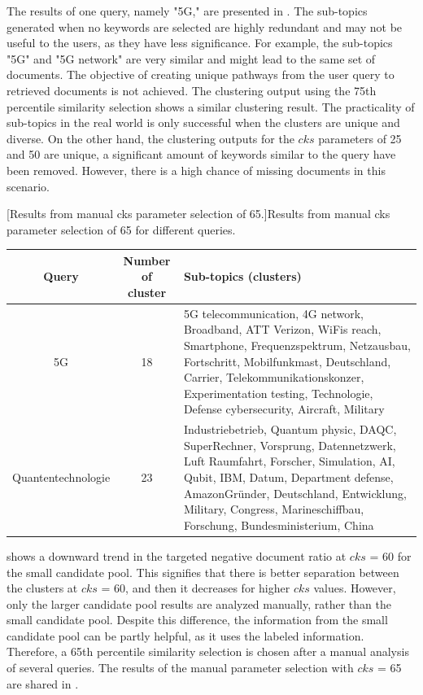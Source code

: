  
The results of one query, namely "5G," are presented in . The sub-topics generated when no keywords are selected are highly redundant and may not be useful to the users, as they have less significance. For example, the sub-topics "5G" and "5G network" are very similar and might lead to the same set of documents. The objective of creating unique pathways from the user query to retrieved documents is not achieved. The clustering output using the 75th percentile similarity selection shows a similar clustering result. The practicality of sub-topics in the real world is only successful when the clusters are unique and diverse. On the other hand, the clustering outputs for the $cks$ parameters of 25 and 50 are unique, a significant amount of keywords similar to the query have been removed. However, there is a high chance of missing documents in this scenario.
 
 
 \begin{center}
 	[Results from manual cks parameter selection of 65.]{Results from manual cks parameter selection of 65 for different queries. }\label{tab:65_output}
 	\begin{tabularx}{.9\textwidth}{|c|c|Y|}
 		\hline
 		Query & Number of cluster & Sub-topics (clusters)\\
 		\hline
 		
 		5G  &          18 & 5G telecommunication, 4G network, Broadband, ATT Verizon, WiFis reach, Smartphone, Frequenzspektrum, Netzausbau, Fortschritt, Mobilfunkmast, Deutschland, Carrier, Telekommunikationskonzer, Experimentation testing, Technologie, Defense cybersecurity, Aircraft, Military \\  \hline
 		
 		Quantentechnologie &          23 & Industriebetrieb, Quantum physic, DAQC, SuperRechner, Vorsprung, Datennetzwerk, Luft Raumfahrt, Forscher, Simulation, AI, Qubit, IBM, Datum, Department defense, AmazonGründer, Deutschland, Entwicklung, Military, Congress, Marineschiffbau, Forschung, Bundesministerium, China \\  \hline
 		
 	\end{tabularx}
 
  \end{center}


 shows a downward trend in the targeted negative document ratio at $cks$ = 60 for the small candidate pool. This signifies that there is better separation between the clusters at $cks$ = 60, and then it decreases for higher $cks$ values. However, only the larger candidate pool results are analyzed manually, rather than the small candidate pool. Despite this difference, the information from the small candidate pool can be partly helpful, as it uses the labeled information. Therefore, a 65th percentile similarity selection is chosen after a manual analysis of several queries. The results of the manual parameter selection with $cks$ = 65 are shared in . 

